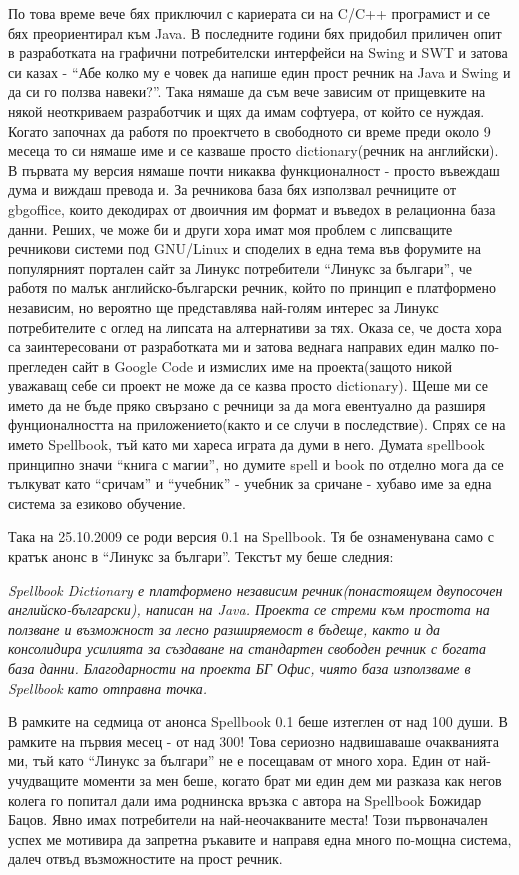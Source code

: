 По това време вече бях приключил с кариерата си на C/C++ програмист и
се бях преориентирал към Java. В последните години бях придобил
приличен опит в разработката на графични потребителски интерфейси на
Swing и SWT и затова си казах - "`Абе колко му е човек да напише един
прост речник на Java и Swing и да си го ползва навеки?"'. Така нямаше
да съм вече зависим от прищевките на някой неоткриваем разработчик и
щях да имам софтуера, от който се нуждая. Когато започнах да работя по
проектчето в свободното си време преди около 9 месеца то си нямаше име
и се казваше просто dictionary(речник на английски). В първата му
версия нямаше почти никаква функционалност - просто въвеждаш дума и
виждаш превода и. За речникова база бях използвал речниците от
gbgoffice, които декодирах от двоичния им формат и въведох в
релационна база данни. Реших, че може би и други хора имат моя проблем
с липсващите речникови системи под GNU/Linux и споделих в една тема
във форумите на популярният портален сайт за Линукс потребители
"`Линукс за българи"', че работя по малък английско-български речник,
който по принцип е платформено независим, но вероятно ще представлява
най-голям интерес за Линукс потребителите с оглед на липсата на
алтернативи за тях. Оказа се, че доста хора са заинтересовани от
разработката ми и затова веднага направих един малко по-прегледен сайт
в Google Code и измислих име на проекта(защото никой уважаващ себе си
проект не може да се казва просто dictionary). Щеше ми се името да не
бъде пряко свързано с речници за да мога евентуално да разширя
фунционалността на приложението(както и се случи в последствие). Спрях
се на името Spellbook, тъй като ми хареса играта да думи в
него. Думата spellbook принципно значи "`книга с магии"', но думите
spell и book по отделно мога да се тълкуват като "`сричам"' и
"`учебник"' - учебник за сричане - хубаво име за една система за
езиково обучение. 

Така на 25.10.2009 се роди версия 0.1 на Spellbook. Тя бе ознаменувана
само с кратък анонс в "`Линукс за българи"'. Текстът му беше следния:

\emph{Spellbook Dictionary е платформено независим речник(понастоящем
  двупосочен английско-български), написан на Java. Проекта се стреми
  към простота на ползване и възможност за лесно разширяемост в
  бъдеще, както и да консолидира усилията за създаване на стандартен
  свободен речник с богата база данни. 
Благодарности на проекта БГ Офис, чиято база използваме в Spellbook
като отправна точка.}

В рамките на седмица от анонса Spellbook 0.1 беше изтеглен от над 100
души. В рамките на първия месец - от над 300! Това сериозно
надвишаваше очакванията ми, тъй като "`Линукс за българи"' не е
посещавам от много хора. Един от най-учудващите моменти за мен беше,
когато брат ми един дем ми разказа как негов колега го попитал дали
има роднинска връзка с автора на Spellbook Божидар Бацов. Явно имах
потребители на най-неочакваните места! Този първоначален успех ме
мотивира да запретна ръкавите и направя една много по-мощна система,
далеч отвъд възможностите на прост речник. 


